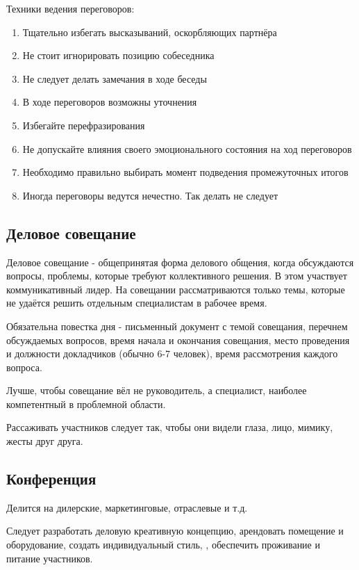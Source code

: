 Техники ведения переговоров:
\begin{enumerate}
    \item Тщательно избегать высказываний, оскорбляющих партнёра
    \item Не стоит игнорировать позицию собеседника
    \item Не следует делать замечания в ходе беседы
    \item В ходе переговоров возможны уточнения
    \item Избегайте перефразирования
    \item Не допускайте влияния своего эмоционального состояния на ход переговоров
    \item Необходимо правильно выбирать момент подведения промежуточных итогов
    \item Иногда переговоры ведутся нечестно. Так делать не следует
\end{enumerate}

\subsection{Деловое совещание}

Деловое совещание - общепринятая форма делового общения, когда обсуждаются вопросы, проблемы, которые требуют коллективного решения. В этом участвует коммуникативный лидер. На совещании рассматриваются только темы, которые не удаётся решить отдельным специалистам в рабочее время.

Обязательна повестка дня - письменный документ с темой совещания, перечнем обсуждаемых вопросов, время начала и окончания совещания, место проведения и должности докладчиков (обычно 6-7 человек), время рассмотрения каждого вопроса.

Лучше, чтобы совещание вёл не руководитель, а специалист, наиболее компетентный в проблемной области.

Рассаживать участников следует так, чтобы они видели глаза, лицо, мимику, жесты друг друга.

\subsection{Конференция}

Делится на дилерские, маркетинговые, отраслевые и т.д.

Следует разработать деловую креативную концепцию, арендовать помещение и оборудование, создать индивидуальный стиль, \missed{}, обеспечить проживание и питание участников.

